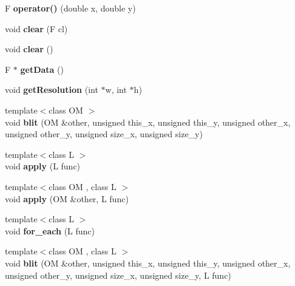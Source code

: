\begin{DoxyCompactItemize}
\item 
\hypertarget{classSDFMap_af729f0143246822bc353410bd7e07b11}{}F {\bfseries operator()} (double x, double y)\label{classSDFMap_af729f0143246822bc353410bd7e07b11}

\item 
\hypertarget{classSDFMap_af5164387d6e3446a10f9658fc1f637c7}{}void {\bfseries clear} (F cl)\label{classSDFMap_af5164387d6e3446a10f9658fc1f637c7}

\item 
\hypertarget{classSDFMap_aa4718eef972f9163c97f7bbda6982619}{}void {\bfseries clear} ()\label{classSDFMap_aa4718eef972f9163c97f7bbda6982619}

\item 
\hypertarget{classSDFMap_af1475e36492f77eca9ab9e58073a83d4}{}F $\ast$ {\bfseries get\+Data} ()\label{classSDFMap_af1475e36492f77eca9ab9e58073a83d4}

\item 
\hypertarget{classSDFMap_a03ee78eaa3bc0332575df312a70459dd}{}void {\bfseries get\+Resolution} (int $\ast$w, int $\ast$h)\label{classSDFMap_a03ee78eaa3bc0332575df312a70459dd}

\item 
\hypertarget{classSDFMap_ac2a2c96cd9d11c2cf7152cda64ae1052}{}{\footnotesize template$<$class O\+M $>$ }\\void {\bfseries blit} (O\+M \&other, unsigned this\+\_\+x, unsigned this\+\_\+y, unsigned other\+\_\+x, unsigned other\+\_\+y, unsigned size\+\_\+x, unsigned size\+\_\+y)\label{classSDFMap_ac2a2c96cd9d11c2cf7152cda64ae1052}

\item 
\hypertarget{classSDFMap_af0b73a27f03e26a3f738b6bb0e55e926}{}{\footnotesize template$<$class L $>$ }\\void {\bfseries apply} (L func)\label{classSDFMap_af0b73a27f03e26a3f738b6bb0e55e926}

\item 
\hypertarget{classSDFMap_a98631ea5eb46630e16093775de355ca7}{}{\footnotesize template$<$class O\+M , class L $>$ }\\void {\bfseries apply} (O\+M \&other, L func)\label{classSDFMap_a98631ea5eb46630e16093775de355ca7}

\item 
\hypertarget{classSDFMap_aa7ce3dbb03d40b7061fd4d7f1d065269}{}{\footnotesize template$<$class L $>$ }\\void {\bfseries for\+\_\+each} (L func)\label{classSDFMap_aa7ce3dbb03d40b7061fd4d7f1d065269}

\item 
\hypertarget{classSDFMap_a0130182b571a1f30b3d7c5a150b50095}{}{\footnotesize template$<$class O\+M , class L $>$ }\\void {\bfseries blit} (O\+M \&other, unsigned this\+\_\+x, unsigned this\+\_\+y, unsigned other\+\_\+x, unsigned other\+\_\+y, unsigned size\+\_\+x, unsigned size\+\_\+y, L func)\label{classSDFMap_a0130182b571a1f30b3d7c5a150b50095}

\end{DoxyCompactItemize}
